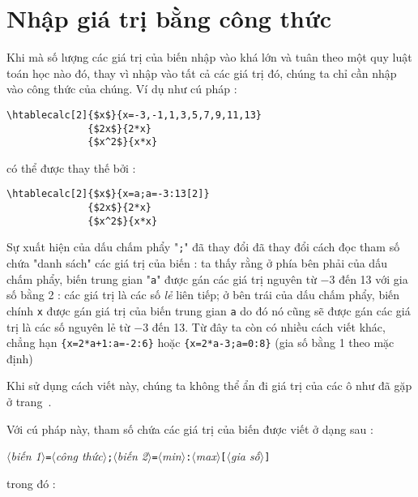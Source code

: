 \documentclass[a4paper,10pt]{article}
\newcommand\argu[1]{$\langle$\textit{#1}$\rangle$}
\newcommand\arguC[1]{\texttt{[}\argu{#1}\texttt{]}}
\newcommand\mywidth{0.85\linewidth}
\begin{document}
\section{Nhập giá trị bằng công thức} \label{nhapbangcongthuc}
Khi mà số lượng các giá trị của biến nhập vào khá lớn và tuân theo một quy luật toán học nào đó, thay vì nhập vào tất cả các giá trị đó, chúng ta chỉ cần nhập vào công thức của chúng. Ví dụ như cú pháp : 
\begin{center}
\begin{minipage}{\mywidth}
\begin{lstlisting}
\htablecalc[2]{$x$}{x=-3,-1,1,3,5,7,9,11,13}
              {$2x$}{2*x}
              {$x^2$}{x*x}
\end{lstlisting}
\end{minipage}
\end{center}
có thể được thay thế bởi :
\begin{center}
\begin{minipage}{\mywidth}
\begin{lstlisting}
\htablecalc[2]{$x$}{x=a;a=-3:13[2]}
              {$2x$}{2*x}
              {$x^2$}{x*x}
\end{lstlisting}
\end{minipage}
\end{center}
Sự xuất hiện của dấu chấm phẩy "\verb=;=" đã thay đổi đã thay đổi cách đọc tham số chứa "danh sách" các giá trị của biến : ta thấy rằng ở phía bên phải của dấu chấm phẩy, biến trung gian "\verb=a=" được gán các giá trị nguyên từ $-3$ đến 13 với gia số bằng 2 : các giá trị là các số \emph{lẻ} liên tiếp; ở bên trái của dấu chấm phẩy, biến chính \verb=x= được gán giá trị của biến trung gian \verb=a= do đó nó cũng sẽ được gán các giá trị là các số nguyên lẻ từ $-3$ đến 13. Từ đây ta còn có nhiều cách viết khác, chẳng hạn \verb|{x=2*a+1:a=-2:6}| hoặc \verb|{x=2*a-3;a=0:8}| (gia số bằng 1 theo mặc định)\bigskip

Khi sử dụng cách viết này, chúng ta không thể ẩn đi giá trị của các ô như đã gặp ở trang~\pageref{ano}.\medskip

Với cú pháp này, tham số chứa các giá trị của biến được viết ở dạng sau :\par\smallskip\nobreak
\hfill\argu{biến 1}\verb|=|\argu{công thức}\verb|;|\argu{biến 2}\verb|=|\argu{min}\verb|:|\argu{max}\arguC{gia số}\hfill{}\smallskip

trong đó :
\end{document}
